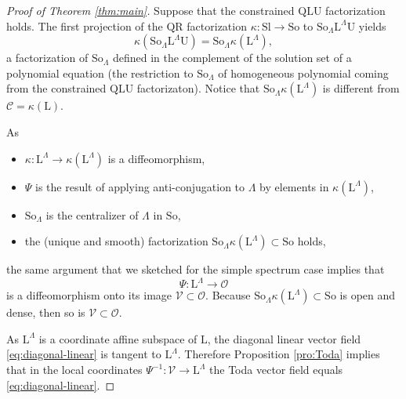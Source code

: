 \documentclass[reqno]{amsart}
\newcommand{\cC}{\mathcal{C}}
\newcommand{\cO}{\mathcal{O}}
\newcommand{\Sl}{\mathrm{Sl}}
\newcommand{\So}{\mathrm{So}}
\renewcommand{\L}{\mathrm{L}}
\newcommand{\U}{\mathrm{U}}
\theoremstyle{definition} %
\begin{document}
\begin{proof}[Proof of Theorem \ref{thm:main}]
Suppose that the constrained $\mathrm{Q}\L\U$ factorization holds. The first projection of the $\mathrm{QR}$ factorization  $\kappa:\Sl\to  \So$ to $\So_\Lambda\L^\Lambda\U$ yields
 \[\kappa(\So_\Lambda\L^\Lambda\U)=\So_\Lambda \kappa(\L^\Lambda),\]
a factorization of $\So_\Lambda$ defined  in  the complement of the solution set of a polynomial equation (the restriction to $\So_\Lambda$ of homogeneous polynomial coming from the constrained $\mathrm{Q}\L\U$ factorizaton). Notice that   $\So_\Lambda \kappa(\L^\Lambda)$ is different from  $\cC=\kappa(\L)$.

As
\begin{itemize}\item $\kappa:\L^\Lambda\to\kappa(\L^\Lambda)$ is a diffeomorphism,   \item $\Psi$ is the result of applying anti-conjugation to $\Lambda$ by elements in $\kappa(\L^\Lambda)$,\item   $\So_\Lambda$ is the centralizer of $\Lambda$ in $\So$,
 \item
 the (unique and smooth) factorization $\So_\Lambda \kappa(\L^\Lambda)\subset \So$ holds,
 \end{itemize}
 the same argument that we sketched for the simple spectrum case implies
that
\[\Psi:\L^\Lambda\longrightarrow\cO\]
is a diffeomorphism onto its image $\mathcal{V}\subset \cO$. Because $\So_\Lambda\kappa(\L^\Lambda)\subset \So$ is open and dense, then so is $\mathcal{V}\subset \cO$.

As $\L^\Lambda$ is a coordinate affine subspace of $\L$, the diagonal linear vector field  \eqref{eq:diagonal-linear} is tangent to
        $\L^\Lambda$. Therefore
Proposition \ref{pro:Toda} implies that in the local coordinates $\Psi^{-1}:\mathcal{V}\to \L^\Lambda$  the Toda vector field equals \eqref{eq:diagonal-linear}.



\end{proof}
\end{document}

